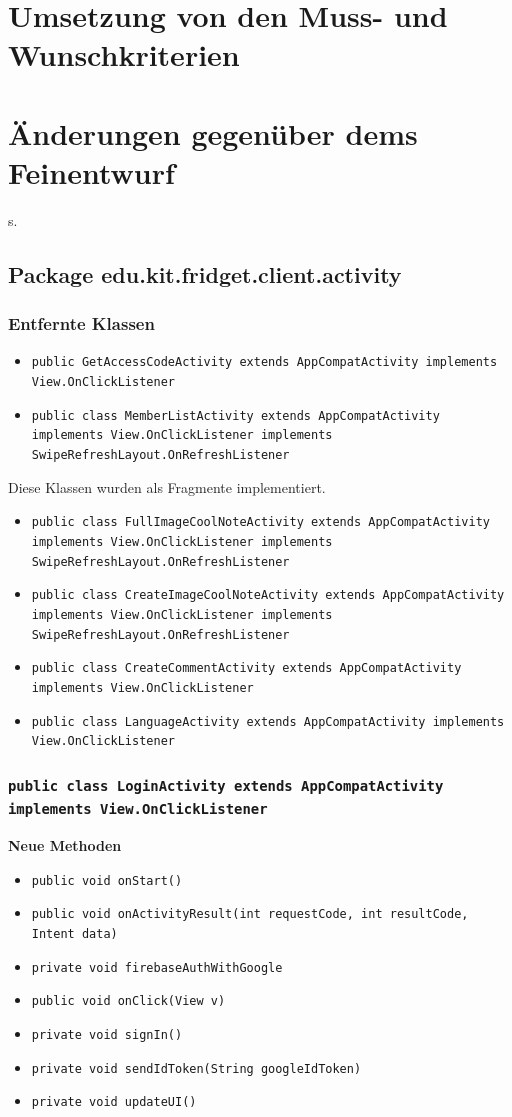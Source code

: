 \documentclass[a4paper]{scrreprt}
\begin{document}
	\chapter{Umsetzung von den Muss- und Wunschkriterien}
	
	\chapter{Änderungen gegenüber dems Feinentwurf}s.
	\section{Package edu.kit.fridget.client.activity}
	\subsection{Entfernte Klassen}
		\begin{itemize}
			\item \texttt{public GetAccessCodeActivity extends AppCompatActivity implements View.OnClickListener}
			\item \texttt{public class MemberListActivity extends AppCompatActivity implements View.OnClickListener implements SwipeRefreshLayout.OnRefreshListener}
		\end{itemize}
			Diese Klassen wurden als Fragmente implementiert.
		\begin{itemize}
			\item \texttt{public class FullImageCoolNoteActivity extends AppCompatActivity implements View.OnClickListener implements SwipeRefreshLayout.OnRefreshListener}
			\item \texttt{public class CreateImageCoolNoteActivity extends AppCompatActivity implements View.OnClickListener implements SwipeRefreshLayout.OnRefreshListener}
			\item \texttt{public class CreateCommentActivity extends AppCompatActivity implements View.OnClickListener}
			\item \texttt{public class LanguageActivity extends AppCompatActivity implements View.OnClickListener}
		\end{itemize}
	
	\subsection{\texttt{public class LoginActivity extends AppCompatActivity implements View.OnClickListener}}
		\textbf{Neue Methoden}
			\begin{itemize}
				\item \texttt{public void onStart()}
				\item \texttt{public void onActivityResult(int requestCode, int resultCode, Intent data)}
				\item \texttt{private void firebaseAuthWithGoogle}
				\item \texttt{public void onClick(View v)}
				\item \texttt{private void signIn()}
				\item \texttt{private void sendIdToken(String googleIdToken)}
				\item \texttt{private void updateUI()}
			\end{itemize}
\end{document}
